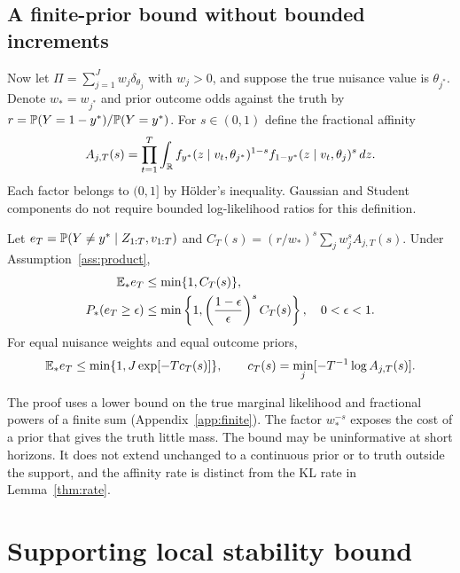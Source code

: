 \subsection{A finite-prior bound without bounded increments}
\label{sec:finite}
Now let $\Pi=\sum_{j=1}^Jw_j\delta_{\theta_j}$ with $w_j>0$, and suppose the true nuisance value is $\theta_{j^*}$. Denote $w_*=w_{j^*}$ and prior outcome odds against the truth by $r=\mathbb P(Y=1-y^*)/\mathbb P(Y=y^*)$. For $s\in(0,1)$ define the fractional affinity
\begin{equation}
 A_{j,T}(s)=\prod_{t=1}^T\int_{\mathbb R}
 f_{y^*}(z\mid v_t,\theta_{j^*})^{1-s}
 f_{1-y^*}(z\mid v_t,\theta_j)^s\,dz.
 \label{eq:affinity}
\end{equation}
Each factor belongs to $(0,1]$ by H\"older's inequality. Gaussian and Student components do not require bounded log-likelihood ratios for this definition.

\begin{proposition}
\label{prop:finite}
Let $e_T=\mathbb P(Y\ne y^*\mid Z_{1:T},v_{1:T})$ and
$C_T(s)=(r/w_*)^s\sum_j w_j^s A_{j,T}(s)$. Under Assumption~\ref{ass:product},
\begin{align}
 \mathbb E_* e_T&\leq\min\{1,C_T(s)\},\label{eq:expected}\\
 P_*(e_T\geq\epsilon)&\leq\min\left\{1,\left(\frac{1-\epsilon}{\epsilon}\right)^s C_T(s)\right\},\quad 0<\epsilon<1.
 \label{eq:tail}
\end{align}
For equal nuisance weights and equal outcome priors,
\[
 \mathbb E_*e_T\leq\min\{1,J\exp[-Tc_T(s)]\},\qquad c_T(s)=\min_j[-T^{-1}\log A_{j,T}(s)].
\]
\end{proposition}
The proof uses a lower bound on the true marginal likelihood and fractional powers of a finite sum (Appendix~\ref{app:finite}). The factor $w_*^{-s}$ exposes the cost of a prior that gives the truth little mass. The bound may be uninformative at short horizons. It does not extend unchanged to a continuous prior or to truth outside the support, and the affinity rate is distinct from the KL rate in Lemma~\ref{thm:rate}.


\section{Supporting local stability bound}
\label{app:supporting-stability}
\label{sec:stability}
